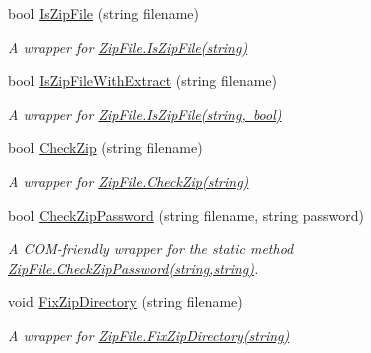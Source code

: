 \begin{DoxyCompactItemize}
\item 
bool \mbox{\hyperlink{class_super_tiled2_unity_1_1_ionic_1_1_zip_1_1_com_helper_abdd05ac40eb679e9a994426d80d272aa}{Is\+Zip\+File}} (string filename)
\begin{DoxyCompactList}\small\item\em A wrapper for \mbox{\hyperlink{class_super_tiled2_unity_1_1_ionic_1_1_zip_1_1_zip_file_ae768213f1dc3cd7a1d62cf42af359d2b}{Zip\+File.\+Is\+Zip\+File(string)}} \end{DoxyCompactList}\item 
bool \mbox{\hyperlink{class_super_tiled2_unity_1_1_ionic_1_1_zip_1_1_com_helper_a7c3db4a8898bc2bb48c6fa19193d295c}{Is\+Zip\+File\+With\+Extract}} (string filename)
\begin{DoxyCompactList}\small\item\em A wrapper for \mbox{\hyperlink{class_super_tiled2_unity_1_1_ionic_1_1_zip_1_1_zip_file_abc936816e59ebc2a66ace620b6bc2632}{Zip\+File.\+Is\+Zip\+File(string, bool)}} \end{DoxyCompactList}\item 
bool \mbox{\hyperlink{class_super_tiled2_unity_1_1_ionic_1_1_zip_1_1_com_helper_a64912ff468b1469ad32718b6f8b5dda4}{Check\+Zip}} (string filename)
\begin{DoxyCompactList}\small\item\em A wrapper for \mbox{\hyperlink{class_super_tiled2_unity_1_1_ionic_1_1_zip_1_1_zip_file_a25223986c875661870fa62d08d68ef45}{Zip\+File.\+Check\+Zip(string)}} \end{DoxyCompactList}\item 
bool \mbox{\hyperlink{class_super_tiled2_unity_1_1_ionic_1_1_zip_1_1_com_helper_ab7c2eb9534a0834b97b072fd37843d72}{Check\+Zip\+Password}} (string filename, string password)
\begin{DoxyCompactList}\small\item\em A C\+O\+M-\/friendly wrapper for the static method \mbox{\hyperlink{class_super_tiled2_unity_1_1_ionic_1_1_zip_1_1_zip_file_abb1bba30c02b71822a1053fa5f4a8204}{Zip\+File.\+Check\+Zip\+Password(string,string)}}. \end{DoxyCompactList}\item 
void \mbox{\hyperlink{class_super_tiled2_unity_1_1_ionic_1_1_zip_1_1_com_helper_aa9fc5f24fa17974fdfa2b9e76ce4442e}{Fix\+Zip\+Directory}} (string filename)
\begin{DoxyCompactList}\small\item\em A wrapper for \mbox{\hyperlink{class_super_tiled2_unity_1_1_ionic_1_1_zip_1_1_zip_file_aca101c62532b74ff851ba8f18e0c9091}{Zip\+File.\+Fix\+Zip\+Directory(string)}} \end{DoxyCompactList}\item 

\end{DoxyCompactItemize}
